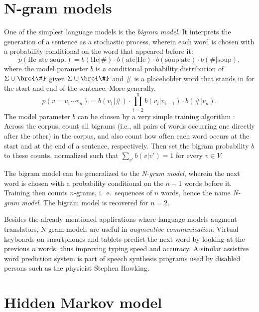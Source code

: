 \section{N-gram models}

One of the simplest language models is the \emph{bigram model}.
\cite{vogler2015} It interprets the generation of a sentence as a stochastic
process, wherein each word is chosen with a probability conditional on the word
that appeared before it:
\[
 p(\text{He ate soup.}) = b(\text{He}|\#) \cdot b(\text{ate}|\text{He}) \cdot b(\text{soup}|\text{ate}) \cdot b(\#|\text{soup}),
\]
where the model parameter $b$ is a conditional probability distribution of
$\Sigma\cup\brc{\#}$ given $\Sigma\cup\brc{\#}$ and $\#$ is a placeholder word
that stands in for the start and end of the sentence. More generally,
\[
 p(v = v_1\cdots v_n) = b(v_1|\#) \cdot \prod_{i=2}^n b(v_i|v_{i-1}) \cdot b(\#|v_n).
\]
The model parameter $b$ can be chosen by a very simple training algorithm
\cite[pp.~123]{jm09}: Across the corpus, count all bigrams (i.e., all pairs of
words occurring one directly after the other) in the corpus, and also count how
often each word occurs at the start and at the end of a sentence, respectively.
Then set the bigram probability $b$ to these counts, normalized such that
$\sum_{v'} b(v|v')=1$ for every $v\in V$.

The bigram model can be generalized to the \emph{N-gram model}, wherein the
next word is chosen with a probability conditional on the $n-1$ words before
it. Training then counts $n$-grams, i.~e.~sequences of $n$ words, hence the
name \emph{N-gram model}. The bigram model is recovered for $n=2$.

Besides the already mentioned applications where language models augment
translators, N-gram models are useful in \emph{augmentive communication}:
Virtual keyboards on smartphones and tablets predict the next word by looking
at the previous $n$ words, thus improving typing speed and accuracy.
\cite{hasan2004n} A similar assistive word prediction system is part of speech
synthesis programs used by disabled persons such as the physicist Stephen
Hawking. \cite{newelletal1998}

\section{Hidden Markov model}

